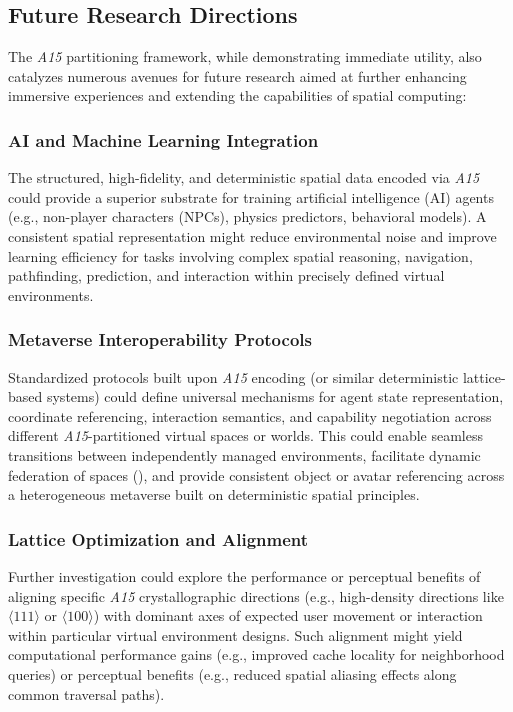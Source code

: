 \documentclass[10pt]{article}
\def\AAAB{\textit{A15}}
\begin{document}
\subsection{Future Research Directions}\label{subsec-outlook-research}

The \AAAB{} partitioning framework, while demonstrating immediate utility, also catalyzes numerous avenues for future research aimed at further enhancing immersive experiences and extending the capabilities of spatial computing:

\subsubsection{AI and Machine Learning Integration}\label{subsubsec-outlook-ai-ml}
The structured, high-fidelity, and deterministic spatial data encoded via \AAAB{} could provide a superior substrate for training artificial intelligence (AI) agents (e.g., non-player characters (NPCs), physics predictors, behavioral models). A consistent spatial representation might reduce environmental noise and improve learning efficiency for tasks involving complex spatial reasoning, navigation, pathfinding, prediction, and interaction within precisely defined virtual environments.

\subsubsection{Metaverse Interoperability Protocols}\label{subsubsec-outlook-interop}
Standardized protocols built upon \AAAB{} encoding (or similar deterministic lattice-based systems) could define universal mechanisms for agent state representation, coordinate referencing, interaction semantics, and capability negotiation across different \AAAB{}-partitioned virtual spaces or worlds. This could enable seamless transitions between independently managed environments, facilitate dynamic federation of spaces (), and provide consistent object or avatar referencing across a heterogeneous metaverse built on deterministic spatial principles.

\subsubsection{Lattice Optimization and Alignment}\label{subsubsec-outlook-lattice}
Further investigation could explore the performance or perceptual benefits of aligning specific \AAAB{} crystallographic directions (e.g., high-density directions like $\langle 111 \rangle$ or $\langle 100 \rangle$) with dominant axes of expected user movement or interaction within particular virtual environment designs. Such alignment might yield computational performance gains (e.g., improved cache locality for neighborhood queries) or perceptual benefits (e.g., reduced spatial aliasing effects along common traversal paths).
\end{document}
